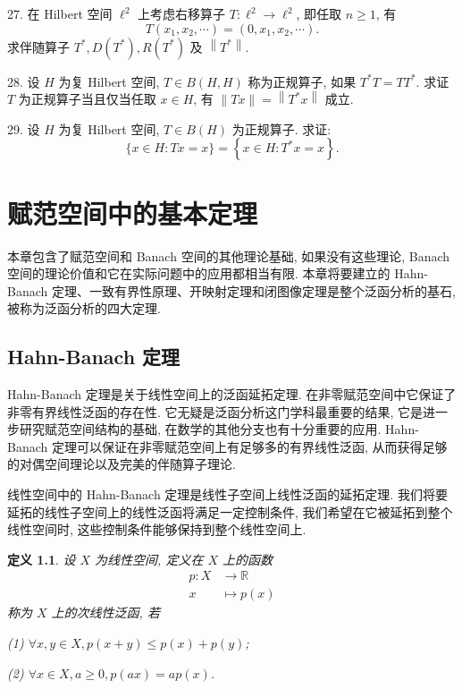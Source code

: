 \documentclass[openany]{ctexbook}
\theoremstyle{kaiti}
\newtheorem{definition}{定义}[section]
\theoremstyle{normal}
\begin{document}
27. 在 Hilbert 空间 $\ell^2$ 上考虑右移算子 $T: \ell^2 \rightarrow \ell^2$, 即任取 $n \geqslant 1$, 有
$$
T\left(x_1, x_2, \cdots\right)=\left(0, x_1, x_2, \cdots\right).
$$
求伴随算子 $T^{*}, D\left(T^{*}\right), R\left(T^{*}\right)$ 及 $\left\|T^{*}\right\|$.

28. 设 $H$ 为复 Hilbert 空间, $T \in B(H, H)$ 称为正规算子, 如果 $T^{*} T=T T^{*}$. 求证 $T$ 为正规算子当且仅当任取 $x \in H$, 有 $\|T x\|=\left\|T^{*} x\right\|$ 成立.

29. 设 $H$ 为复 Hilbert 空间, $T \in B(H)$ 为正规算子. 求证:
$$
\{x \in H: T x=x\}=\left\{x \in H: T^{*} x=x\right\}.
$$

\chapter{赋范空间中的基本定理}

本章包含了赋范空间和 Banach 空间的其他理论基础, 如果没有这些理论, Banach 空间的理论价值和它在实际问题中的应用都相当有限. 本章将要建立的 Hahn-Banach 定理、一致有界性原理、开映射定理和闭图像定理是整个泛函分析的基石, 被称为泛函分析的四大定理.

\section{Hahn-Banach 定理}

Hahn-Banach 定理是关于线性空间上的泛函延拓定理. 在非零赋范空间中它保证了非零有界线性泛函的存在性. 它无疑是泛函分析这门学科最重要的结果, 它是进一步研究赋范空间结构的基础, 在数学的其他分支也有十分重要的应用. Hahn-Banach 定理可以保证在非零赋范空间上有足够多的有界线性泛函, 从而获得足够的对偶空间理论以及完美的伴随算子理论.

线性空间中的 Hahn-Banach 定理是线性子空间上线性泛函的延拓定理. 我们将要延拓的线性子空间上的线性泛函将满足一定控制条件, 我们希望在它被延拓到整个线性空间时, 这些控制条件能够保持到整个线性空间上.

\begin{definition}
设 $X$ 为线性空间, 定义在 $X$ 上的函数
$$
  \begin{aligned}
    p: X & \rightarrow \mathbb{R} \\
    x & \mapsto p(x)
  \end{aligned}
$$
称为 $X$ 上的次线性泛函, 若

(1) $\forall x, y \in X, p(x+y) \leqslant p(x)+p(y)$;

(2) $\forall x \in X, a \geqslant 0, p(a x)=a p(x)$.
\end{definition}
\end{document}
